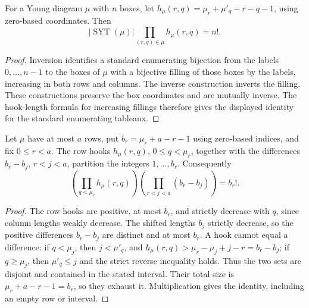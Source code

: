 \begin{lemma}
\label{lem:standard-hook-count}
\leanok
For a Young diagram $\mu$ with $n$ boxes, let
$h_\mu(r,q)=\mu_r+\mu'_q-r-q-1$, using zero-based coordinates.
Then
\[
 |\operatorname{SYT}(\mu)|\prod_{(r,q)\in\mu}h_\mu(r,q)=n!.
\]
\end{lemma}
\begin{proof}
Inversion identifies a standard enumerating bijection from the labels
$0,\ldots,n-1$ to the boxes of $\mu$ with a bijective filling of those
boxes by the labels, increasing in both rows and columns. The inverse
construction inverts the filling. These constructions preserve the box
coordinates and are mutually inverse. The hook-length formula for
increasing fillings therefore gives the displayed identity for the
standard enumerating tableaux.
\end{proof}

\begin{lemma}
\label{lem:row-hook-complement}
\leanok
Let $\mu$ have at most $a$ rows, put $b_r=\mu_r+a-r-1$ using
zero-based indices, and fix $0\leq r<a$. The row hooks
$h_\mu(r,q)$, $0\leq q<\mu_r$, together with the differences
$b_r-b_j$, $r<j<a$, partition the integers $1,\ldots,b_r$.
Consequently
\[
 \left(\prod_{q<\mu_r}h_\mu(r,q)\right)
 \left(\prod_{r<j<a}(b_r-b_j)\right)=b_r!.
\]
\end{lemma}
\begin{proof}
The row hooks are positive, at most $b_r$, and strictly decrease
with $q$, since column lengths weakly decrease. The shifted lengths
$b_j$ strictly decrease, so the positive differences $b_r-b_j$ are
distinct and at most $b_r$. A hook cannot equal a difference: if
$q<\mu_j$, then $j<\mu'_q$, and
$h_\mu(r,q)>\mu_r-\mu_j+j-r=b_r-b_j$; if $q\geq\mu_j$,
then $\mu'_q\leq j$ and the strict reverse inequality holds.
Thus the two sets are disjoint and contained in the stated interval.
Their total size is $\mu_r+a-r-1=b_r$, so they exhaust it.
Multiplication gives the identity, including an empty row or interval.
\end{proof}

